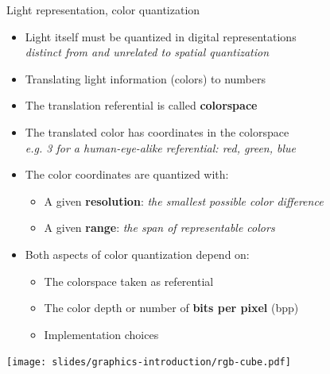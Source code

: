\begin{frame}{Light representation, color quantization}
  \begin{minipage}[c]{0.75\textwidth}
    \begin{itemize}
    \item Light itself must be quantized in digital representations\\
    \textit{distinct from and unrelated to spatial quantization}
    \item Translating light information (colors) to numbers
    \item The translation referential is called \textbf{colorspace}
    \item The translated color has coordinates in the colorspace\\
    \textit{e.g. 3 for a human-eye-alike referential: red, green, blue}
    \item The color coordinates are quantized with:
      \begin{itemize}
      \item A given \textbf{resolution}:
      \textit{the smallest possible color difference}
      \item A given \textbf{range}:
      \textit{the span of representable colors}
      \end{itemize}
    \item Both aspects of color quantization depend on:
      \begin{itemize}
      \item The colorspace taken as referential
      \item The color depth or number of \textbf{bits per pixel} (bpp)
      \item Implementation choices
      \end{itemize}
    \end{itemize}
  \end{minipage}
  \hfill
  \begin{minipage}[c]{0.225\textwidth}
    \centering
    \texttt{[image: slides/graphics-introduction/rgb-cube.pdf]}
  \end{minipage}
\end{frame}

